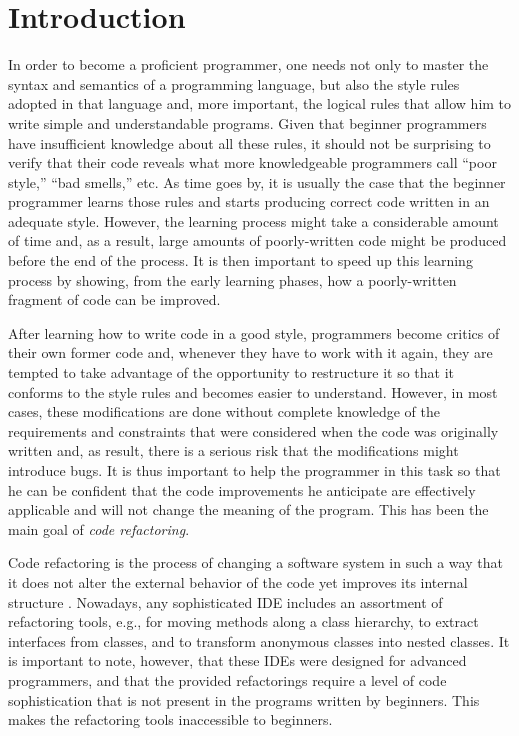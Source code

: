 \section{Introduction}
In order to become a proficient programmer, one needs not only to
master the syntax and semantics of a programming language, but also
the style rules adopted in that language and, more important, the
logical rules that allow him to write simple and understandable
programs.  Given that beginner programmers have insufficient knowledge
about all these rules, it should not be surprising to verify that
their code reveals what more knowledgeable programmers call ``poor
style,'' ``bad smells,'' etc.  As time goes by, it is usually the case
that the beginner programmer learns those rules and starts producing
correct code written in an adequate style.  However, the learning
process might take a considerable amount of time and, as a result,
large amounts of poorly-written code might be produced before the end
of the process.  It is then important to speed up this learning
process by showing, from the early learning phases, how a
poorly-written fragment of code can be improved.

After learning how to write code in a good style, programmers become
critics of their own former code and, whenever they have to work with
it again, they are tempted to take advantage of the opportunity to
restructure it so that it conforms to the style rules and becomes
easier to understand.  However, in most cases, these modifications are
done without complete knowledge of the requirements and constraints
that were considered when the code was originally written and, as
result, there is a serious risk that the modifications might introduce
bugs.  It is thus important to help the programmer in this task so
that he can be confident that the code improvements he anticipate are
effectively applicable and will not change the meaning of the program.
This has been the main goal of \emph{code refactoring}.

Code refactoring is the process of changing a software system in such
a way that it does not alter the external behavior of the code yet
improves its internal structure \cite{fowler1999refactoring}.
Nowadays, any sophisticated IDE includes an assortment of refactoring
tools, e.g., for moving methods along a class hierarchy, to extract
interfaces from classes, and to transform anonymous classes into
nested classes.  It is important to note, however, that these IDEs
were designed for advanced programmers, and that the provided
refactorings require a level of code sophistication that is not
present in the programs written by beginners.  This makes the refactoring
tools inaccessible to beginners.

